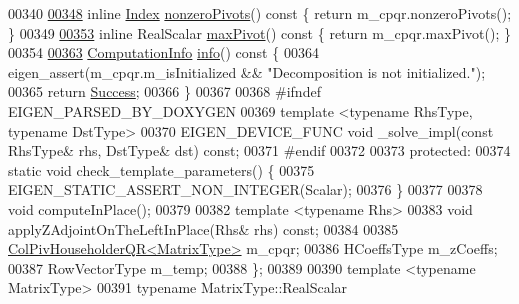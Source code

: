 \begin{DoxyCode}
00340 
\hyperlink{group___q_r___module_af9d7a5bdbc16a4a0bf7394ef0dd208da}{00348}   \textcolor{keyword}{inline} \hyperlink{namespace_eigen_a62e77e0933482dafde8fe197d9a2cfde}{Index} \hyperlink{group___q_r___module_af9d7a5bdbc16a4a0bf7394ef0dd208da}{nonzeroPivots}()\textcolor{keyword}{ const }\{ \textcolor{keywordflow}{return} m\_cpqr.nonzeroPivots(); \}
00349 
\hyperlink{group___q_r___module_a5b712a58c13b7e5089be9228ec42f738}{00353}   \textcolor{keyword}{inline} RealScalar \hyperlink{group___q_r___module_a5b712a58c13b7e5089be9228ec42f738}{maxPivot}()\textcolor{keyword}{ const }\{ \textcolor{keywordflow}{return} m\_cpqr.maxPivot(); \}
00354 
\hyperlink{group___q_r___module_a1f5c45f78848cfdbb96963cefbbb3274}{00363}   \hyperlink{group__enums_ga85fad7b87587764e5cf6b513a9e0ee5e}{ComputationInfo} \hyperlink{group___q_r___module_a1f5c45f78848cfdbb96963cefbbb3274}{info}()\textcolor{keyword}{ const }\{
00364     eigen\_assert(m\_cpqr.m\_isInitialized && \textcolor{stringliteral}{"Decomposition is not initialized."});
00365     \textcolor{keywordflow}{return} \hyperlink{group__enums_gga85fad7b87587764e5cf6b513a9e0ee5ea52581b035f4b59c203b8ff999ef5fcea}{Success};
00366   \}
00367 
00368 \textcolor{preprocessor}{#ifndef EIGEN\_PARSED\_BY\_DOXYGEN}
00369   \textcolor{keyword}{template} <\textcolor{keyword}{typename} RhsType, \textcolor{keyword}{typename} DstType>
00370   EIGEN\_DEVICE\_FUNC \textcolor{keywordtype}{void} \_solve\_impl(\textcolor{keyword}{const} RhsType& rhs, DstType& dst) \textcolor{keyword}{const};
00371 \textcolor{preprocessor}{#endif}
00372 
00373  \textcolor{keyword}{protected}:
00374   \textcolor{keyword}{static} \textcolor{keywordtype}{void} check\_template\_parameters() \{
00375     EIGEN\_STATIC\_ASSERT\_NON\_INTEGER(Scalar);
00376   \}
00377 
00378   \textcolor{keywordtype}{void} computeInPlace();
00379 
00382   \textcolor{keyword}{template} <\textcolor{keyword}{typename} Rhs>
00383   \textcolor{keywordtype}{void} applyZAdjointOnTheLeftInPlace(Rhs& rhs) \textcolor{keyword}{const};
00384 
00385   \hyperlink{group___q_r___module}{ColPivHouseholderQR<MatrixType>} m\_cpqr;
00386   HCoeffsType m\_zCoeffs;
00387   RowVectorType m\_temp;
00388 \};
00389 
00390 \textcolor{keyword}{template} <\textcolor{keyword}{typename} MatrixType>
00391 \textcolor{keyword}{typename} MatrixType::RealScalar

\end{DoxyCode}
